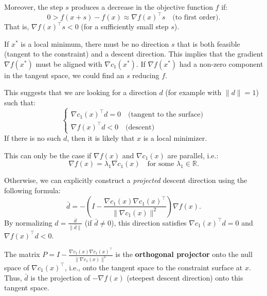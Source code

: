 Moreover, the step $s$ produces a decrease in the objective function $f$ if:
\begin{equation}
    0 > f(x+s) - f(x) \approx \nabla f(x)^\top s \quad \text{(to first order)}.
\end{equation}
That is, $\nabla f(x)^\top s < 0$ (for a sufficiently small step $s$).

If $x^*$ is a local minimum, there must be no direction $s$ that is both feasible (tangent to the constraint) and a descent direction. This implies that the gradient $\nabla f(x^*)$ must be aligned with $\nabla c_1(x^*)$. If $\nabla f(x^*)$ had a non-zero component in the tangent space, we could find an $s$ reducing $f$.

This suggests that we are looking for a direction $d$ (for example with $\|d\|=1$) such that:
\begin{equation}
    \begin{cases}
    \nabla c_1(x)^\top d = 0 \quad \text{(tangent to the surface)} \\
    \nabla f(x)^\top d < 0 \quad \text{(descent)}
    \end{cases}
\end{equation}
If there is no such $d$, then it is likely that $x$ is a local minimizer.

This can only be the case if $\nabla f(x)$ and $\nabla c_1(x)$ are parallel, i.e.:
\begin{equation}
    \nabla f(x) = \lambda_1 \nabla c_1(x) \quad \text{for some } \lambda_1 \in \mathbb{R}.
\end{equation}

Otherwise, we can explicitly construct a \textit{projected} descent direction using the following formula:
\begin{equation}
    \bar{d} = - \left( I - \frac{\nabla c_1(x) \nabla c_1(x)^\top}{\|\nabla c_1(x)\|^2} \right) \nabla f(x).
\end{equation}
By normalizing $d = \frac{\bar{d}}{\|\bar{d}\|}$ (if $\bar{d} \neq 0$), this direction satisfies $\nabla c_1(x)^\top d = 0$ and $\nabla f(x)^\top d < 0$.

\begin{remarque}
The matrix $P = I - \frac{\nabla c_1(x) \nabla c_1(x)^\top}{\|\nabla c_1(x)\|^2}$ is the \textbf{orthogonal projector} onto the null space of $\nabla c_1(x)^\top$, i.e., onto the tangent space to the constraint surface at $x$. Thus, $\bar{d}$ is the projection of $-\nabla f(x)$ (steepest descent direction) onto this tangent space.
\end{remarque}

